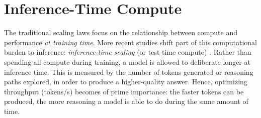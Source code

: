 \section{Inference-Time Compute}
\label{sec:inference-time}



The traditional scaling laws focus on the relationship between compute and performance \textit{at training time}. More recent studies shift part of this computational burden to inference: \emph{inference-time scaling} (or test-time compute) \citep{muennighoff2025s1}. Rather than spending all compute during training, a model is allowed to deliberate longer at inference time. This is measured by the number of tokens generated or reasoning paths explored, in order to produce a higher-quality answer. Hence, optimizing throughput (tokens/s) becomes of prime importance: the faster tokens can be produced, the more reasoning a model is able to do during the same amount of time. 

